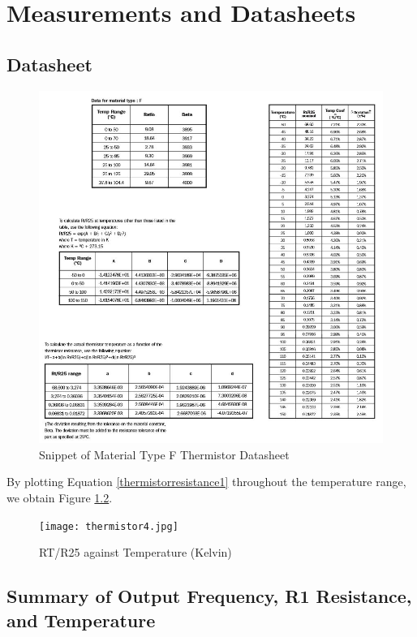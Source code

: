 \chapter{Measurements and Datasheets} 

\section{Datasheet}

\begin{figure}[H]
	\centering
	\includegraphics[width=0.8\linewidth]{thermistordatasheet.jpg}
	\caption{Snippet of Material Type F Thermistor Datasheet \cite{thermistor}}
	\label{thermistordatasheet}
\end{figure}

By plotting Equation \ref{thermistorresistance1} throughout the temperature range, we obtain Figure \ref{RTR25temperature}. 

\begin{figure}[H]
	\centering
	\texttt{[image: thermistor4.jpg]}
	\caption{RT/R25 against Temperature (Kelvin)}
	\label{RTR25temperature}
\end{figure}

\section{Summary of Output Frequency, R1 Resistance, and Temperature}
\label{appthermistorpso}

